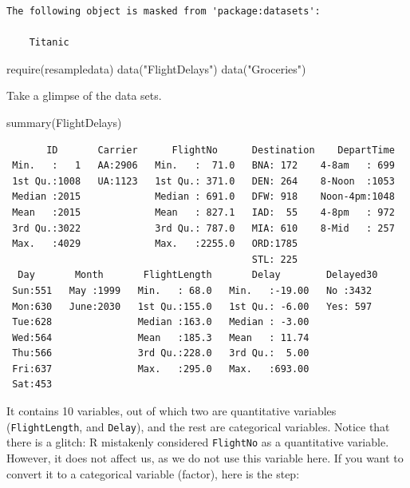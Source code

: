 \documentclass[
  letterpaper,
  DIV=11,
  numbers=noendperiod]{scrreprt}
\newenvironment{Shaded}{\begin{snugshade}}{\end{snugshade}}
\newcommand{\FunctionTok}[1]{\textcolor[rgb]{0.28,0.35,0.67}{#1}}
\newcommand{\NormalTok}[1]{\textcolor[rgb]{0.00,0.23,0.31}{#1}}
\newcommand{\StringTok}[1]{\textcolor[rgb]{0.13,0.47,0.30}{#1}}
\begin{document}
\begin{verbatim}
The following object is masked from 'package:datasets':

    Titanic
\end{verbatim}

\begin{Shaded}
\begin{Highlighting}[]
\FunctionTok{require}\NormalTok{(resampledata)}
\FunctionTok{data}\NormalTok{(}\StringTok{"FlightDelays"}\NormalTok{)}
\FunctionTok{data}\NormalTok{(}\StringTok{"Groceries"}\NormalTok{)}
\end{Highlighting}
\end{Shaded}

Take a glimpse of the data sets.

\begin{Shaded}
\begin{Highlighting}[]
\FunctionTok{summary}\NormalTok{(FlightDelays)}
\end{Highlighting}
\end{Shaded}

\begin{verbatim}
       ID       Carrier      FlightNo      Destination    DepartTime  
 Min.   :   1   AA:2906   Min.   :  71.0   BNA: 172    4-8am   : 699  
 1st Qu.:1008   UA:1123   1st Qu.: 371.0   DEN: 264    8-Noon  :1053  
 Median :2015             Median : 691.0   DFW: 918    Noon-4pm:1048  
 Mean   :2015             Mean   : 827.1   IAD:  55    4-8pm   : 972  
 3rd Qu.:3022             3rd Qu.: 787.0   MIA: 610    8-Mid   : 257  
 Max.   :4029             Max.   :2255.0   ORD:1785                   
                                           STL: 225                   
  Day       Month       FlightLength       Delay        Delayed30 
 Sun:551   May :1999   Min.   : 68.0   Min.   :-19.00   No :3432  
 Mon:630   June:2030   1st Qu.:155.0   1st Qu.: -6.00   Yes: 597  
 Tue:628               Median :163.0   Median : -3.00             
 Wed:564               Mean   :185.3   Mean   : 11.74             
 Thu:566               3rd Qu.:228.0   3rd Qu.:  5.00             
 Fri:637               Max.   :295.0   Max.   :693.00             
 Sat:453                                                          
\end{verbatim}

It contains 10 variables, out of which two are quantitative variables
(\texttt{FlightLength}, and \texttt{Delay}), and the rest are
categorical variables. Notice that there is a glitch: R mistakenly
considered \texttt{FlightNo} as a quantitative variable. However, it
does not affect us, as we do not use this variable here. If you want to
convert it to a categorical variable (factor), here is the step:
\end{document}
